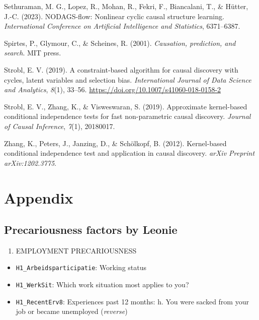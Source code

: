 \documentclass[
]{article}
\providecommand{\tightlist}{%
  \setlength{\itemsep}{0pt}\setlength{\parskip}{0pt}}\usepackage{longtable,booktabs,array}
\newlength{\cslhangindent}
\newenvironment{CSLReferences}[2] %
 {\begin{list}{}{%
  \setlength{\itemindent}{0pt}
  \setlength{\leftmargin}{0pt}
  \setlength{\parsep}{0pt}
  \ifodd #1
   \setlength{\leftmargin}{\cslhangindent}
   \setlength{\itemindent}{-1\cslhangindent}
  \fi
  \setlength{\itemsep}{#2\baselineskip}}}
 {\end{list}}
\begin{document}
\begin{CSLReferences}{1}{0}
Sethuraman, M. G., Lopez, R., Mohan, R., Fekri, F., Biancalani, T., \&
Hütter, J.-C. (2023). NODAGS-flow: Nonlinear cyclic causal structure
learning. \emph{International Conference on Artificial Intelligence and
Statistics}, 6371--6387.

Spirtes, P., Glymour, C., \& Scheines, R. (2001). \emph{Causation,
prediction, and search}. MIT press.

Strobl, E. V. (2019). A constraint-based algorithm for causal discovery
with cycles, latent variables and selection bias. \emph{International
Journal of Data Science and Analytics}, \emph{8}(1), 33--56.
\url{https://doi.org/10.1007/s41060-018-0158-2}

Strobl, E. V., Zhang, K., \& Visweswaran, S. (2019). Approximate
kernel-based conditional independence tests for fast non-parametric
causal discovery. \emph{Journal of Causal Inference}, \emph{7}(1),
20180017.

Zhang, K., Peters, J., Janzing, D., \& Schölkopf, B. (2012).
Kernel-based conditional independence test and application in causal
discovery. \emph{arXiv Preprint arXiv:1202.3775}.

\end{CSLReferences}

\section{Appendix}\label{sec-appendix}

\subsection{Precariousness factors by
Leonie}\label{precariousness-factors-by-leonie}

\begin{enumerate}
\def\labelenumi{\arabic{enumi}.}
\tightlist
\item
  EMPLOYMENT PRECARIOUSNESS
\end{enumerate}

\begin{itemize}
\tightlist
\item
  \texttt{H1\_Arbeidsparticipatie}: Working status
\item
  \texttt{H1\_WerkSit}: Which work situation most applies to you?
\item
  \texttt{H1\_RecentErv8}: Experiences past 12 months: h. You were
  sacked from your job or became unemployed (\emph{reverse})
\end{itemize}
\end{document}
